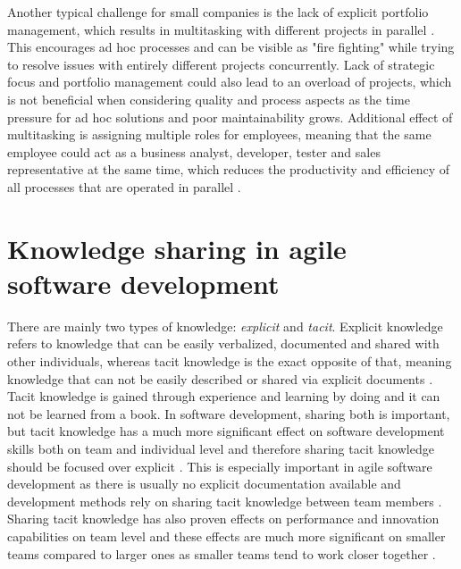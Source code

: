 Another typical challenge for small companies is the lack of explicit portfolio management, which results in multitasking with different projects in parallel \citep{Vahaniitty2010}.
This encourages ad hoc processes and can be visible as "fire fighting" while trying to resolve issues with entirely different projects concurrently. Lack of strategic focus and
portfolio management could also lead to an overload of projects, which is not beneficial when considering quality and process aspects as the time pressure for ad hoc solutions
and poor maintainability grows. Additional effect of multitasking is assigning multiple roles for employees, meaning that 
the same employee could act as a business analyst, developer,
tester and sales representative at the same time, which reduces the productivity and efficiency of all processes that are operated in parallel \citep{Hasan2011}.

\section{Knowledge sharing in agile software development}
\label{section:knowledge-sharing}

There are mainly two types of knowledge: \emph{explicit} and \emph{tacit}. Explicit knowledge refers to knowledge that can be easily verbalized,
documented and shared with other individuals, whereas tacit knowledge is the exact opposite of that, meaning knowledge that can not be easily described
or shared via explicit documents \citep{Ryan2013}. Tacit knowledge is gained through
experience and learning by doing and it can not be learned from a book. In software development, sharing both is important, but tacit knowledge
has a much more significant effect on software development skills both on team and individual level and therefore sharing tacit knowledge
should be focused over explicit \citep{Ersoy2015}\citep{Ryan2013}.
This is especially important in agile software development as there is usually no explicit documentation available and development methods
rely on sharing tacit knowledge between team members \citep{Ryan2013}. Sharing tacit knowledge has also proven effects on performance and innovation
capabilities on team level \citep{Wang2012} and these effects are much more significant on smaller teams compared to larger ones as smaller teams tend
to work closer together \citep{Ersoy2015}.

